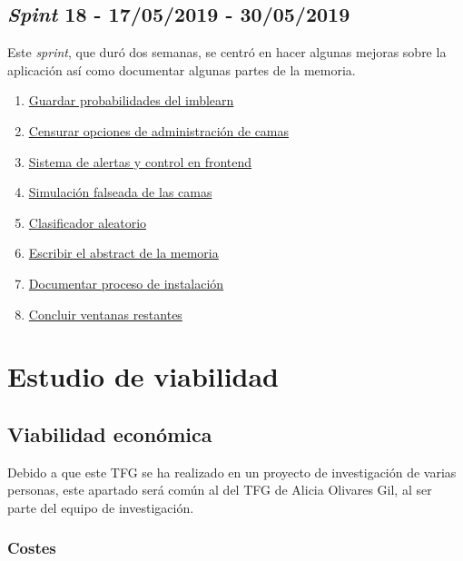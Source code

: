 \subsection{\textit{Spint} 18 - 17/05/2019 - 30/05/2019}
Este \textit{sprint}, que duró dos semanas, se centró en hacer algunas mejoras sobre la aplicación así como documentar algunas partes de la memoria.

\begin{enumerate}\addtocounter{enumi}{84}
	\item 
	\href{https://github.com/jlgarridol/TFG-SmartBeds/issues/85}{Guardar probabilidades del imblearn}
	\item 
	\href{https://github.com/jlgarridol/TFG-SmartBeds/issues/86}{Censurar opciones de administración de camas}
	\item 
	\href{https://github.com/jlgarridol/TFG-SmartBeds/issues/87}{Sistema de alertas y control en frontend}
	\item 
	\href{https://github.com/jlgarridol/TFG-SmartBeds/issues/88}{Simulación falseada de las camas}
	\item 
	\href{https://github.com/jlgarridol/TFG-SmartBeds/issues/89}{Clasificador aleatorio}
	\item 
	\href{https://github.com/jlgarridol/TFG-SmartBeds/issues/90}{Escribir el abstract de la memoria}
	\item 
	\href{https://github.com/jlgarridol/TFG-SmartBeds/issues/91}{Documentar proceso de instalación}
	\item 
	\href{https://github.com/jlgarridol/TFG-SmartBeds/issues/92}{Concluir ventanas restantes}
\end{enumerate}

\section{Estudio de viabilidad}

\subsection{Viabilidad económica}

Debido a que este TFG se ha realizado en un proyecto de investigación de varias personas, este apartado será común al del TFG de Alicia Olivares Gil, al ser parte del equipo de investigación.

\subsubsection{Costes}

